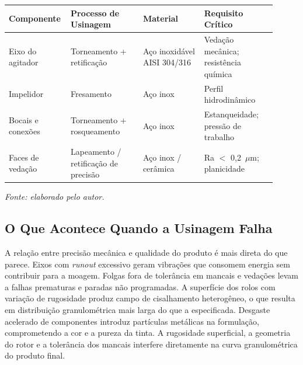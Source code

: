 \documentclass[
  12pt,
  a4paper,
  oneside,
  brazil,
  chapter=TITLE
]{article}
\newcommand{\quadrofonte}[1]{\par\noindent\textit{Fonte: #1}\vspace{1em}\par}
\begin{document}
\begin{longtable}[]{@{}
  >{\raggedright\arraybackslash}p{0.17\linewidth}
  >{\raggedright\arraybackslash}p{0.26\linewidth}
  >{\raggedright\arraybackslash}p{0.22\linewidth}
  >{\raggedright\arraybackslash}p{0.26\linewidth}@{}}
\toprule\noalign{}
\begin{minipage}[b]{\linewidth}\raggedright
\textbf{Componente}
\end{minipage} &
\begin{minipage}[b]{\linewidth}\raggedright
\textbf{Processo de Usinagem}
\end{minipage} &
\begin{minipage}[b]{\linewidth}\raggedright
\textbf{Material}
\end{minipage} &
\begin{minipage}[b]{\linewidth}\raggedright
\textbf{Requisito Crítico}
\end{minipage} \\
\midrule\noalign{}
\endhead
\bottomrule\noalign{}
\endlastfoot
Eixo do agitador &
  Torneamento + retificação &
  Aço inoxidável AISI 304/316 &
  Vedação mecânica; resistência química \\
Impelidor &
  Fresamento &
  Aço inox &
  Perfil hidrodinâmico \\
Bocais e conexões &
  Torneamento + rosqueamento &
  Aço inox &
  Estanqueidade; pressão de trabalho \\
Faces de vedação &
  Lapeamento / retificação de precisão &
  Aço inox / cerâmica &
  Ra $<$ 0,2~$\mu$m; planicidade \\
\end{longtable}

\quadrofonte{elaborado pelo autor.}

\subsection{O Que Acontece Quando a Usinagem Falha}

A relação entre precisão mecânica e qualidade do produto é mais direta do que
parece. Eixos com \textit{runout} excessivo geram vibrações que consomem
energia sem contribuir para a moagem. Folgas fora de tolerância em mancais e
vedações levam a falhas prematuras e paradas não programadas. A superfície dos
rolos com variação de rugosidade produz campo de cisalhamento heterogêneo, o
que resulta em distribuição granulométrica mais larga do que a especificada.
Desgaste acelerado de componentes introduz partículas metálicas na formulação,
comprometendo a cor e a pureza da tinta. A rugosidade superficial, a geometria
do rotor e a tolerância dos mancais interfere diretamente na curva
granulométrica do produto final.
\end{document}
